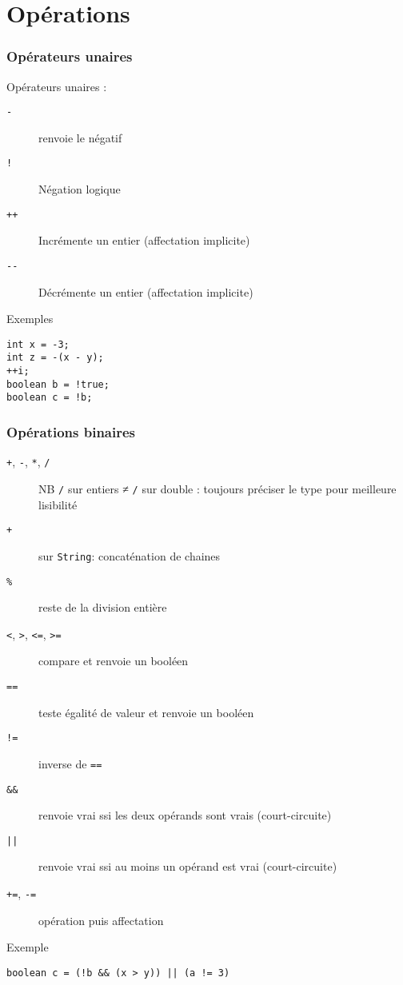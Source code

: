 \documentclass[english, french]{beamer}
\begin{document}
\section{Opérations}
\begin{frame}[fragile]
	\frametitle{Opérateurs unaires}
	Opérateurs unaires :
	\begin{description}
		\item[\texttt{-}] renvoie le négatif
		\item[\texttt{!}] Négation logique
		\item[\texttt{++}] Incrémente un entier (affectation implicite)
		\item[\texttt{-{}-}] Décrémente un entier (affectation implicite)
	\end{description}
	\begin{block}{Exemples}
		\begin{lstlisting}
int x = -3;
int z = -(x - y);
++i;
boolean b = !true;
boolean c = !b;
		\end{lstlisting}	
	\end{block}
\end{frame}

\begin{frame}[fragile]
	\frametitle{Opérations binaires}
	\begin{description}
		\item[\texttt{+}, \texttt{-}, \texttt{*}, \texttt{/}] NB \texttt{/} sur entiers ≠ \texttt{/} sur double : toujours préciser le type pour meilleure lisibilité
		\item[\texttt{+}] sur \texttt{String}: concaténation de chaines
		\item[\texttt{\%}] reste de la division entière
		\item[\texttt{<}, \texttt{>}, \texttt{<=}, \texttt{>=}] compare et renvoie un booléen
		\item[\texttt{==}] teste égalité de valeur et renvoie un booléen
		\item[\texttt{!=}] inverse de \texttt{==}
		\item[\texttt{\&\&}] renvoie vrai ssi les deux opérands sont vrais {\tiny (court-circuite)}
		\item[\texttt{||}] renvoie vrai ssi au moins un opérand est vrai {\tiny (court-circuite)}
		\item[\texttt{+=}, \texttt{-=}] opération puis affectation
	\end{description}
	\begin{block}{Exemple}
		\begin{lstlisting}
boolean c = (!b && (x > y)) || (a != 3)
		\end{lstlisting}	
	\end{block}
\end{frame}
\end{document}
